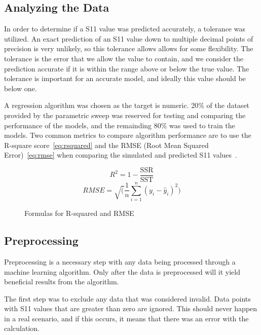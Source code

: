 \documentclass[lettersize,journal]{IEEEtran}
\begin{document}
\subsection{Analyzing the Data}
In order to determine if a S11 value was predicted accurately, a tolerance was utilized. An exact prediction of an S11 value down to multiple decimal points of precision is very unlikely, so this tolerance allows allows for some flexibility. The tolerance is the error that we allow the value to contain, and we consider the prediction accurate if it is within the range above or below the true value. The tolerance is important for an accurate model, and ideally this value should be below one.

A regression algorithm was chosen as the target is numeric. 20\% of the dataset provided by the parametric sweep was reserved for testing and comparing the performance of the models, and the remainding 80\% was used to train the models. Two common metrics to compare algorithm performance are to use the R-square score~\eqref{eq:rsquared} and the RMSE (Root Mean Squared Error)~\eqref{eq:rmse} when comparing the simulated and predicted S11 values~\cite{haque_machine_2023,m_el-kenawy_optimized_2022}. 

\begin{figure}
    \begin{equation}
        R^2 = 1 - \frac{\text{SSR}}{\text{SST}}
        \label{eq:rsquared}
    \end{equation}
    \begin{equation}
        {RMSE} = \sqrt(\frac{1}{n} \sum_{i=1}^{n}(y_i - \hat{y}_i)^2)
        \label{eq:rmse}
    \end{equation}
    \caption{Formulas for R-squared and RMSE}
\end{figure}



\subsection{Preprocessing}
Preprocessing is a necessary step with any data being processed through a machine learning algorithm. Only after the data is preprocessed will it yield beneficial results from the algorithm. 

The first step was to exclude any data that was considered invalid. Data points with S11 values that are greater than zero are ignored. This should never happen in a real scenario, and if this occurs, it means that there was an error with the calculation. 
\end{document}
